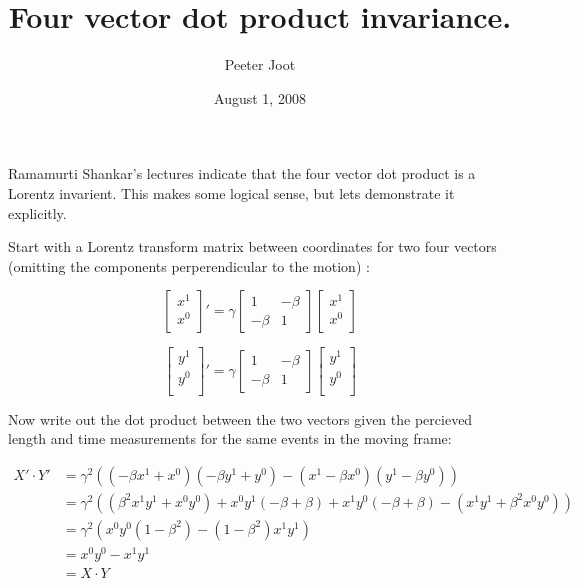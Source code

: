 \documentclass{article}      %
\title{Four vector dot product invariance.} %
\author{Peeter Joot}         %
\date{August 1, 2008}        %
\begin{document}

\maketitle{}

\section{}

Ramamurti Shankar's lectures indicate that the four vector dot product
is a Lorentz invarient.  This makes some logical sense, but lets demonstrate it explicitly.

Start with a Lorentz transform matrix between coordinates for two four vectors (omitting the components perperendicular  to the motion) :

\begin{equation*}
{
\begin{bmatrix}
x^1 \\
x^0 \\
\end{bmatrix}
}'
=
\gamma
\begin{bmatrix}
1 & -\beta \\
-\beta & 1
\end{bmatrix}
\begin{bmatrix}
x^1 \\
x^0 \\
\end{bmatrix}
\end{equation*}

\begin{equation*}
{
\begin{bmatrix}
y^1 \\
y^0 \\
\end{bmatrix}
}'
=
\gamma
\begin{bmatrix}
1 & -\beta \\
-\beta & 1
\end{bmatrix}
\begin{bmatrix}
y^1 \\
y^0 \\
\end{bmatrix}
\end{equation*}

Now write out the dot product between the two vectors given the percieved length and time measurements for the same events in the moving frame:

\begin{align*}
X' \cdot Y' 
&= \gamma^2 \left( (-\beta x^1 + x^0)(-\beta y^1 + y^0) -(x^1 -\beta x^0) (y^1 -\beta y^0) \right) \\
&= \gamma^2 \left( (\beta^2 x^1 y^1 + x^0 y^0) + x^0 y^1( -\beta + \beta ) + x^1 y^0( -\beta + \beta ) -(x^1 y^1 + \beta^2 x^0 y^0) \right) \\
&= \gamma^2 \left( x^0 y^0 (1-\beta^2) - (1-\beta^2) x^1 y^1 \right) \\
&= x^0 y^0 - x^1 y^1 \\
&= X \cdot Y
\end{align*}
\end{document}
